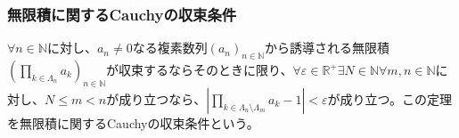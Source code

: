 \documentclass[dvipdfmx]{jsarticle}
\begin{document}
\subsubsection{無限積に関するCauchyの収束条件}%
\begin{thm}[無限積に関するCauchyの収束条件]\label{4.3.4.1}
$\forall n \in \mathbb{N}$に対し、$a_{n} \neq 0$なる複素数列$\left( a_{n} \right)_{n \in \mathbb{N}}$から誘導される無限積$\left( \prod_{k \in \varLambda_{n}} a_{k} \right)_{n \in \mathbb{N}}$が収束するならそのときに限り、$\forall\varepsilon \in \mathbb{R}^{+}\exists N \in \mathbb{N}\forall m,n \in \mathbb{N}$に対し、$N \leq m < n$が成り立つなら、$\left| \prod_{k \in \varLambda_{n} \setminus \varLambda_{m}} a_{k} - 1 \right| < \varepsilon$が成り立つ。この定理を無限積に関するCauchyの収束条件という。
\end{thm}
\end{document}
